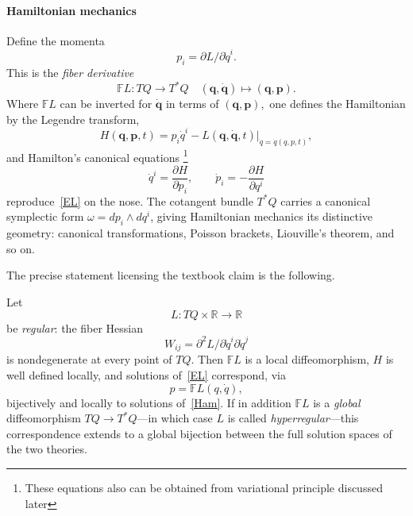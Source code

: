 \paragraph{Hamiltonian mechanics}
Define the momenta 
\[p_i = \partial L/\partial \dot q^i.\]
This is the \emph{fiber derivative} 
\[\mathbb{F}L: TQ \to T^*Q \quad (\bm q,\dot {\bm q})\mapsto (\bm q, \bm p).\]
Where $\mathbb{F}L$ can be inverted for $\dot {\bm q}$ in terms of $(\bm q,\bm p)$,\
one defines the Hamiltonian by the Legendre transform,
\begin{equation}
    H(\bm q,\bm p,t) = p_i \dot q^i - 
    L(\bm q,\dot {\bm q}, t)\Big|_{\dot q = \dot q(q,p,t)} ,
\end{equation}
and Hamilton's canonical equations \footnote{ These equations also can 
be obtained from variational principle discussed later}
\begin{equation}
\label{Ham}
\dot q^i = \frac{\partial H}{\partial p_i}, \qquad 
    \dot p_i = -\frac{\partial H}{\partial q^i}
\end{equation}
reproduce~\eqref{EL} on the nose. The cotangent bundle $T^*Q$ carries a
canonical symplectic form $\omega = dp_i \wedge dq^i$, giving Hamiltonian
mechanics its distinctive geometry: canonical transformations, Poisson
brackets, Liouville's theorem, and so on.

The precise statement licensing the textbook claim is the following.
\begin{proposition}
\label{regular}
Let $$L: TQ\times\mathbb{R}\to\mathbb{R}$$
    be \emph{regular}: the fiber Hessian
    $$W_{ij} = \partial^2 L/\partial \dot q^i \partial \dot q^j$$
    is nondegenerate at every point of $TQ$. Then $\mathbb{F}L$ is a local
    diffeomorphism, $H$ is well defined locally, and solutions of~\eqref{EL}
    correspond, via 
    $$p = \mathbb{F}L(q,\dot q),$$ 
    bijectively and locally to
    solutions of~\eqref{Ham}. If in addition $\mathbb{F}L$ is a \emph{global}
    diffeomorphism $TQ \to T^*Q$---in which case $L$ is called
    \emph{hyperregular}---this correspondence extends to a global bijection
    between the full solution spaces of the two theories.
\end{proposition}

